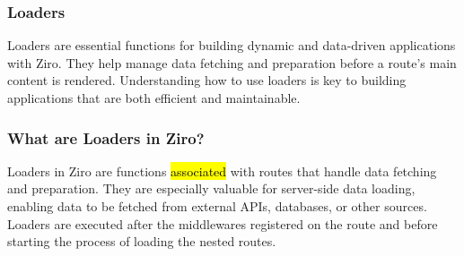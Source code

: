 

\subsubsection{Loaders}
Loaders are essential functions for building dynamic and data-driven applications with Ziro. They help manage data fetching and preparation before a route’s main content is rendered. Understanding how to use loaders is key to building applications that are both efficient and maintainable.

\subsubsection*{What are Loaders in Ziro?}
Loaders in Ziro are functions \hl{associated} with routes that handle data fetching and preparation. They are especially valuable for server-side data loading, enabling data to be fetched from external APIs, databases, or other sources. Loaders are executed after the middlewares registered on the route and before starting the process of loading the nested routes.

\pagebreak
